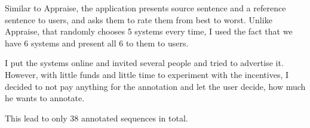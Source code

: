 Similar to Appraise, the application presents source sentence and a reference sentence to users, and
asks them to rate them from best to worst.
Unlike Appraise, that randomly chooses 5 systems every time, I used the fact that we have 6 systems and present all 6 to them to users.

I put the systems online and invited several people and tried to advertise it. However, with little funds and little time to experiment with the incentives, I decided to not pay anything for the annotation and let the user decide, how much he wants to annotate.

This lead to only 38 annotated sequences in total.

\begin{comment}


\subsubsection{Human evaluation}
TODO: moje plány s TrueSkill/Appraise, co nevyšly, protože mi to nikdo neanotoval. Za celou dobu mi tam 4 lidé odanotovali asi 13 vět.

\subsection{Baseline}


\jednatabulkan{bleubase} { |r|r|r | }
{
\hline
&
intercorp&
WMT\\ \hline
BLEU & 0.77\% $\pm$ 0.06\%
&
0.83\% $\pm$ 0.16\%

\\ \hline
}{Baseline BLEU}


Resulting BLEU is very low, as expected.

\subsubsection{Discussion}
We can see the results are not ideal. The sentences are evidently translated word-by-word, without any regard for the whole sentence, or the correct word order.

Because the languages are similar, the morphological information is sometimes transferred correctly -- for example, \uv{s hrdostí vzpomněl} -> \uv{с гордостью вспомнил} -- but sometimes, very incorrectly -- for example, genitive \uv{překrásné} is not with the correct ending as \uv{-ой}, but incorrectly as \uv{-ое}.


\end{comment}
